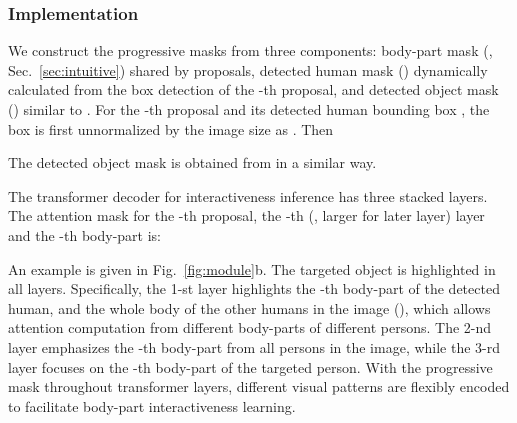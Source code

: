 \documentclass[runningheads]{llncs}
\begin{document}
\subsubsection{Implementation}
We construct the progressive masks from three components: body-part mask  (, Sec.~\ref{sec:intuitive}) shared by proposals, detected human mask  () dynamically calculated from the box detection of the -th proposal, and detected object mask  () similar to .
For the -th proposal and its detected human bounding box , the box is first unnormalized by the image size as . Then 

The detected object mask  is obtained from  in a similar way.

The transformer decoder  for interactiveness inference has three stacked layers.
The attention mask  for the -th proposal, the -th (, larger for later layer) layer and the -th body-part is:

An example is given in Fig.~\ref{fig:module}b.
The targeted object is highlighted in all layers.
Specifically, the 1-st layer highlights the -th body-part of the detected human, and the whole body of the other humans in the image (), which allows attention computation from different body-parts of different persons. 
The 2-nd layer emphasizes the -th body-part from all persons in the image, while the 3-rd layer focuses on the -th body-part of the targeted person.
With the progressive mask throughout transformer layers, different visual patterns are flexibly encoded to facilitate body-part interactiveness learning. 
\end{document}
